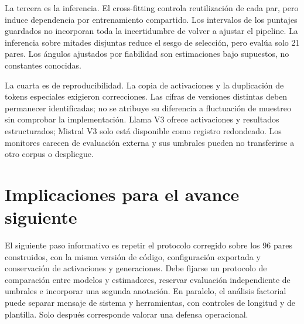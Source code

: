 La tercera es la inferencia. El cross-fitting controla reutilización de cada par, pero induce dependencia por entrenamiento compartido. Los intervalos de los puntajes guardados no incorporan toda la incertidumbre de volver a ajustar el pipeline. La inferencia sobre mitades disjuntas reduce el sesgo de selección, pero evalúa solo 21 pares. Los ángulos ajustados por fiabilidad son estimaciones bajo supuestos, no constantes conocidas.

La cuarta es de reproducibilidad. La copia de activaciones y la duplicación de tokens especiales exigieron correcciones. Las cifras de versiones distintas deben permanecer identificadas; no se atribuye su diferencia a fluctuación de muestreo sin comprobar la implementación. Llama V3 ofrece activaciones y resultados estructurados; Mistral V3 solo está disponible como registro redondeado. Los monitores carecen de evaluación externa y sus umbrales pueden no transferirse a otro corpus o despliegue.

\section{Implicaciones para el avance siguiente}

El siguiente paso informativo es repetir el protocolo corregido sobre los 96 pares construidos, con la misma versión de código, configuración exportada y conservación de activaciones y generaciones. Debe fijarse un protocolo de comparación entre modelos y estimadores, reservar evaluación independiente de umbrales e incorporar una segunda anotación. En paralelo, el análisis factorial puede separar mensaje de sistema y herramientas, con controles de longitud y de plantilla. Solo después corresponde valorar una defensa operacional.
